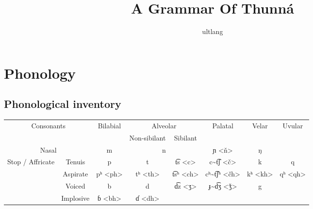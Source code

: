 \documentclass[11pt]{article} %
\title{A Grammar Of Thunná}
\author{ultlang}
\begin{document}
\maketitle

\section{Phonology}
	\subsection{Phonological inventory}
		\begin{center}
		\begin{adjustbox}{width={\textwidth},totalheight={\textheight},keepaspectratio}%
		\renewcommand{\arraystretch}{1.25}
			\begin{tabular}{|c|c||c|c|c|c|c|c|}
				
				\hline
				\multicolumn{2}{|c||}{\multirow{2}{*}{Consonants}} & \multirow{2}{*}{Bilabial} & \multicolumn{2}{c|}{Alveolar} & \multirow{2}{*}{Palatal}   & \multirow{2}{*}{Velar} & \multirow{2}{*}{Uvular} \\
				\cline{4-5}
				\multicolumn{2}{|c||}{}                            &                           & Non-sibilant    & Sibilant    &                            &                        &                         \\ \hline\hline
				 
				\multicolumn{2}{|c||}{Nasal}                       & m                         & \multicolumn{2}{c|}{n}        & ɲ <ň>                      & ŋ                      &                         \\ \hline
				
				\multirow{4}{*}{Stop / Affricate} & Tenuis         & p                         & t               & t͡s <c>     & c\textasciitilde{}t͡ʃ <č>    &  k                   & q                       \\ \cline{2-8}
												  & Aspirate       & pʰ <ph>                   & tʰ <th>         & t͡sʰ <ch>   & cʰ\textasciitilde{}t͡ʃʰ <čh> & kʰ <kh>              & qʰ <qh>                 \\ \cline{2-8}
												  & Voiced         & b                         & d               & d͡z <ʒ>     & ɟ\textasciitilde{}d͡ʒ <ǯ>    &  g                   &                         \\ \cline{2-8}
												  & Implosive      & ɓ <bh>                    & ɗ <dh>          &             &                              &                      &                         \\ \hline
				

\end{tabular}
\end{adjustbox}
\end{center}
\end{document}
